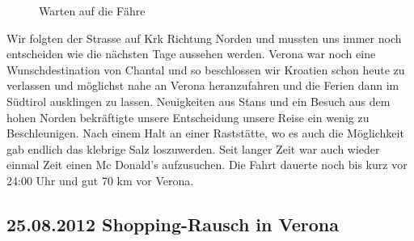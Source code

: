 \begin{figure}[H]
   \centering
   \quad
   \quad
   \quad
   \caption[Warten auf die Fähre]{Warten auf die Fähre}
\end{figure}

Wir folgten der Strasse auf Krk Richtung Norden und mussten uns immer noch entscheiden wie die nächsten Tage aussehen werden.
Verona war noch eine Wunschdestination von Chantal und so beschlossen wir Kroatien schon heute zu verlassen und möglichst nahe an Verona heranzufahren und die Ferien dann im Südtirol ausklingen zu lassen.
Neuigkeiten aus Stans und ein Besuch aus dem hohen Norden bekräftigte unsere Entscheidung unsere Reise ein wenig zu Beschleunigen.
Nach einem Halt an einer Raststätte,
wo es auch die Möglichkeit gab endlich das klebrige Salz loszuwerden.
Seit langer Zeit war auch wieder einmal Zeit einen Mc Donald's aufzusuchen.
Die Fahrt dauerte noch bis kurz vor 24:00 Uhr und gut 70 km vor Verona.

\subsection{25.08.2012 Shopping-Rausch in Verona}

